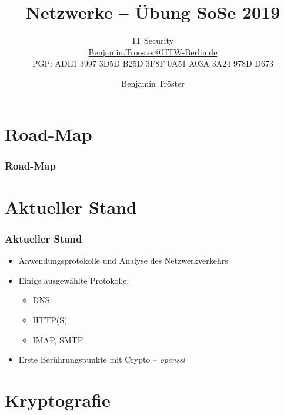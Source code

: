 \documentclass[xcolor=dvipsnames, aspectratio=169]{beamer}
\begin{document}

\title{Netzwerke -- Übung SoSe 2019}
\subtitle{IT Security\\
		\href{mailto:Benjamin.Troester@HTW-Berlin.de}{Benjamin.Troester@HTW-Berlin.de}\\
		PGP: ADE1 3997 3D5D B25D 3F8F 0A51 A03A 3A24 978D D673 }
\author{Benjamin Tröster}

\date{}

\begin{frame}
\titlepage

\end{frame}

\section*{Road-Map}
\begin{frame}
\frametitle{Road-Map}
\begin{multicols}{2}
  \tableofcontents
\end{multicols}
\end{frame}

\section{Aktueller Stand}
\begin{frame}
	\frametitle{Aktueller Stand}
	\begin{itemize}
		\item Anwendungsprotokolle und Analyse des Netzwerkverkehrs
		\item Einige ausgewählte Protokolle:
		\begin{itemize}
			\item DNS
			\item HTTP(S)
			\item IMAP, SMTP
		\end{itemize}
		\item Erste Berührungspunkte mit Crypto -- \emph{openssl}
	\end{itemize}
\end{frame}

\section{Kryptografie}
\end{document}
